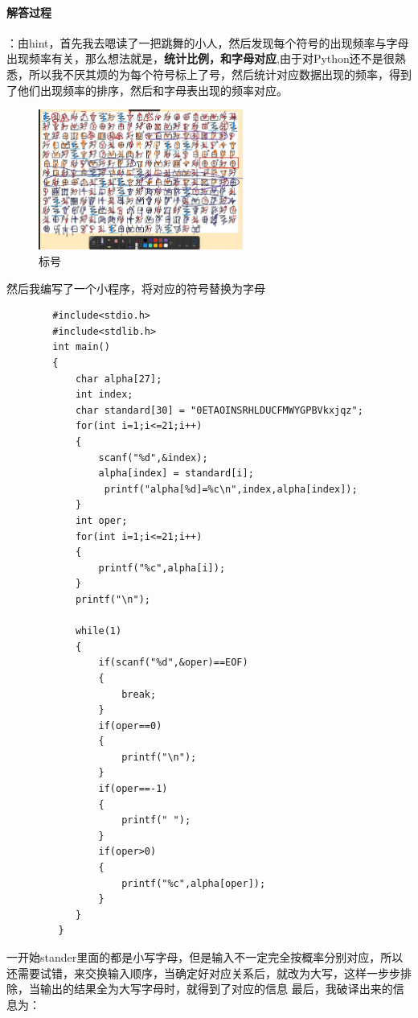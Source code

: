 \documentclass{article}
\begin{document}
\paragraph*{解答过程}：由hint，首先我去嗯读了一把跳舞的小人，然后发现每个符号的出现频率与字母出现频率有关，那么想法就是，\textbf{统计比例，和字母对应},由于对Python还不是很熟悉，所以我不厌其烦的为每个符号标上了号，然后统计对应数据出现的频率，得到了他们出现频率的排序，然后和字母表出现的频率对应。
    \begin{figure}[H]
        \centering
        \includegraphics[width=0.6\textwidth]{./figure/crypto.jpg}
        \caption{标号}
    \end{figure}
    然后我编写了一个小程序，将对应的符号替换为字母
    \begin{verbatim}
        #include<stdio.h>
        #include<stdlib.h>
        int main()
        {
            char alpha[27];
            int index;
            char standard[30] = "0ETAOINSRHLDUCFMWYGPBVkxjqz";
            for(int i=1;i<=21;i++)
            {
                scanf("%d",&index);
                alpha[index] = standard[i];
                 printf("alpha[%d]=%c\n",index,alpha[index]);
            }
            int oper;
            for(int i=1;i<=21;i++)
            {
                printf("%c",alpha[i]);
            }
            printf("\n");
           
            while(1)
            {
                if(scanf("%d",&oper)==EOF)
                {
                    break;
                }
                if(oper==0)
                {
                    printf("\n");
                }
                if(oper==-1)
                {
                    printf(" ");
                }
                if(oper>0)
                {
                    printf("%c",alpha[oper]);
                }
            }
         }
    \end{verbatim}
    一开始stander里面的都是小写字母，但是输入不一定完全按概率分别对应，所以还需要试错，来交换输入顺序，当确定好对应关系后，就改为大写，这样一步步排除，当输出的结果全为大写字母时，就得到了对应的信息
    最后，我破译出来的信息为：
\end{document}
